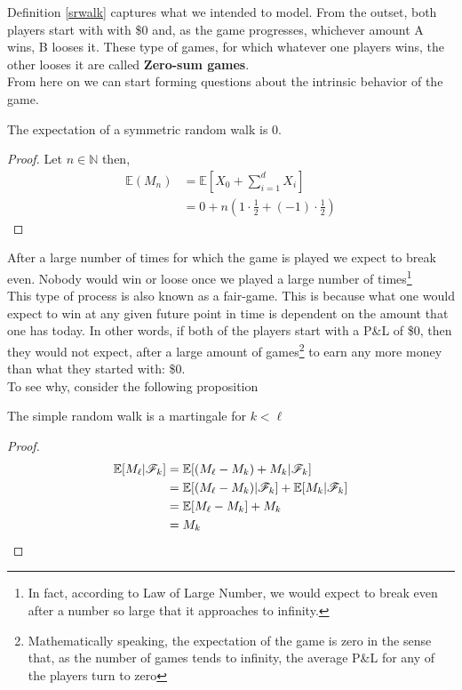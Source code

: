 \documentclass[../TGMAFFIRO]{subfiles}
\begin{document}
Definition \ref{srwalk} captures what we intended to model. From the outset, both players start with with \$0 and, as the game progresses, whichever amount A wins, B looses it. These type of games, for which whatever one players wins, the other looses it are called \textbf{Zero-sum games}.\\

From here on we can start forming questions about the intrinsic behavior of the game. 

\begin{proposition}\label{expectation_srw}
	The expectation of a symmetric random walk is 0.
\end{proposition}

\begin{proof}
	Let $n \in \mathbb{N}$ then,
	\begin{align}
	\mathbb{E}(M_n) &= \mathbb{E}\left[X_0 + \sum_{i=1}^d X_i\right] \nonumber \\
				    &= 0 + n  \left( 1 \cdot \frac{1}{2} + (-1) \cdot \frac{1}{2}\right) \nonumber
	\end{align}
\end{proof}

After a large number of times for which the game is played we expect to break even. Nobody would win or loose once we played a large number of times\footnote{In fact, according to Law of Large Number, we would expect to break even after a number so large that it approaches to infinity.}\\

This type of process is also known as a fair-game. This is because what one would expect to win at any given future point in time is dependent on the amount that one has today. In other words, if both of the players start with a P\&L of \$0, then they would not expect, after a large amount of games\footnote{Mathematically speaking, the expectation of the game is zero in the sense that, as the number of games tends to infinity, the average P\&L for any of the players turn to zero} to earn any more money than what they started with: \$0.\\

To see why, consider the following proposition

\begin{proposition}
	The simple random walk is a martingale for $k < \ell$
\end{proposition}

\begin{proof}
	\begin{align*}
				\mathbb{E}[M_\ell|\mathscr{F}_k] &= \mathbb{E}[(M_\ell - M_k) + M_k | \mathscr{F}_k] \\
				&= \mathbb{E}[(M_\ell - M_k) | \mathscr{F}_k] + \mathbb{E}[M_k | \mathscr{F}_k] \\
				&= \mathbb{E}[M_\ell - M_k] + M_k\\
				&= M_k
	\end{align*}
\end{proof}
\end{document}

